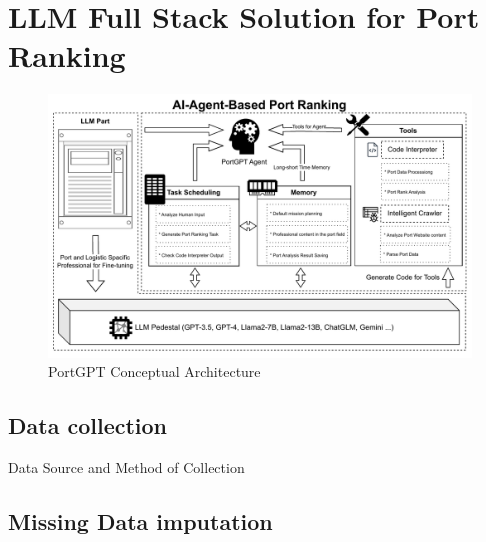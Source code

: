 \documentclass[preprint]{elsarticle}
\begin{document}
\section{LLM Full Stack Solution for Port Ranking}
\begin{figure}[H]
    \centering
    \includegraphics[width=1.0\textwidth]{pic/PortGPT.pdf}
    \caption{PortGPT Conceptual Architecture}
\end{figure}
% 
% 
% 
\subsection{Data collection}
% 
Data Source and Method of Collection
% 
\subsection{Missing Data imputation}
% 
% 
% 
% 
\cite{SUN2023120201}
% 
% 
% 
% 
% 
% 
% 
% 
% 
% 
% 
% 
% 
% 
% 
% 
% 
% 
% 
% 
% 
% 
% 
% 
% 
% 
% 
% 
% 
% 
% 
% 
% 
% 
% 
% 
% 
% 
% 
% 
% 


% 
% 
% 
% 
% 
% 
% 
% 
% 
% 
% 
% 
% 


% 
% 
% 
% 
% 
\end{document}
